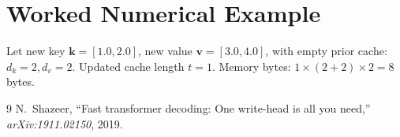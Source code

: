\documentclass[11pt,a4paper]{article}
\theoremstyle{definition}
\begin{document}
\section{Worked Numerical Example}
Let new key $\mathbf{k} = [1.0, 2.0]$, new value $\mathbf{v} = [3.0, 4.0]$, with empty prior cache:
$d_k = 2, d_v = 2$.
Updated cache length $t = 1$.
Memory bytes: $1 \times (2 + 2) \times 2 = 8$ bytes.

\begin{thebibliography}{9}
 N.~Shazeer, ``Fast transformer decoding: One write-head is all you need,'' \emph{arXiv:1911.02150}, 2019.
\end{thebibliography}
\end{document}
